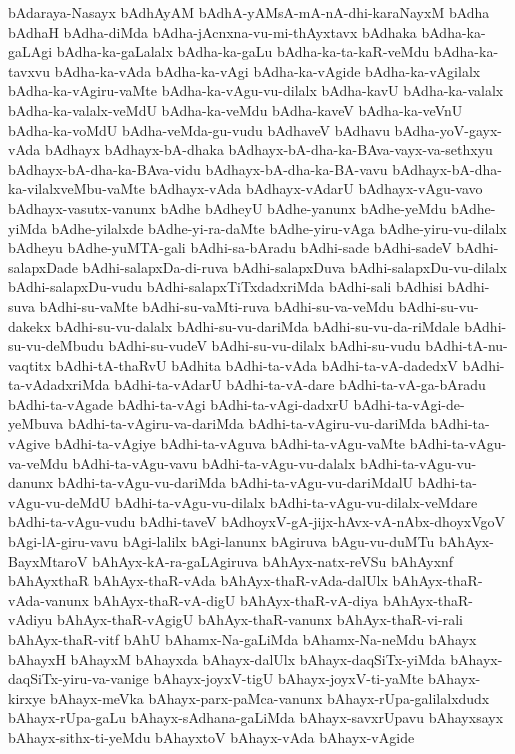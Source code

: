 {bAdaraya-Nasayx
bAdhAyAM
bAdhA-yAMsA-mA-nA-dhi-karaNayxM
bAdha
bAdhaH
bAdha-diMda
bAdha-jAcnxna-vu-mi-thAyxtavx
bAdhaka
bAdha-ka-gaLAgi
bAdha-ka-gaLalalx
bAdha-ka-gaLu
bAdha-ka-ta-kaR-veMdu
bAdha-ka-tavxvu
bAdha-ka-vAda
bAdha-ka-vAgi
bAdha-ka-vAgide
bAdha-ka-vAgilalx
bAdha-ka-vAgiru-vaMte
bAdha-ka-vAgu-vu-dilalx
bAdha-kavU
bAdha-ka-valalx
bAdha-ka-valalx-veMdU
bAdha-ka-veMdu
bAdha-kaveV
bAdha-ka-veVnU
bAdha-ka-voMdU
bAdha-veMda-gu-vudu
bAdhaveV
bAdhavu
bAdha-yoV-gayx-vAda
bAdhayx
bAdhayx-bA-dhaka
bAdhayx-bA-dha-ka-BAva-vayx-va-sethxyu
bAdhayx-bA-dha-ka-BAva-vidu
bAdhayx-bA-dha-ka-BA-vavu
bAdhayx-bA-dha-ka-vilalxveMbu-vaMte
bAdhayx-vAda
bAdhayx-vAdarU
bAdhayx-vAgu-vavo
bAdhayx-vasutx-vanunx
bAdhe
bAdheyU
bAdhe-yanunx
bAdhe-yeMdu
bAdhe-yiMda
bAdhe-yilalxde
bAdhe-yi-ra-daMte
bAdhe-yiru-vAga
bAdhe-yiru-vu-dilalx
bAdheyu
bAdhe-yuMTA-gali
bAdhi-sa-bAradu
bAdhi-sade
bAdhi-sadeV
bAdhi-salapxDade
bAdhi-salapxDa-di-ruva
bAdhi-salapxDuva
bAdhi-salapxDu-vu-dilalx
bAdhi-salapxDu-vudu
bAdhi-salapxTiTxdadxriMda
bAdhi-sali
bAdhisi
bAdhi-suva
bAdhi-su-vaMte
bAdhi-su-vaMti-ruva
bAdhi-su-va-veMdu
bAdhi-su-vu-dakekx
bAdhi-su-vu-dalalx
bAdhi-su-vu-dariMda
bAdhi-su-vu-da-riMdale
bAdhi-su-vu-deMbudu
bAdhi-su-vudeV
bAdhi-su-vu-dilalx
bAdhi-su-vudu
bAdhi-tA-nu-vaqtitx
bAdhi-tA-thaRvU
bAdhita
bAdhi-ta-vAda
bAdhi-ta-vA-dadedxV
bAdhi-ta-vAdadxriMda
bAdhi-ta-vAdarU
bAdhi-ta-vA-dare
bAdhi-ta-vA-ga-bAradu
bAdhi-ta-vAgade
bAdhi-ta-vAgi
bAdhi-ta-vAgi-dadxrU
bAdhi-ta-vAgi-de-yeMbuva
bAdhi-ta-vAgiru-va-dariMda
bAdhi-ta-vAgiru-vu-dariMda
bAdhi-ta-vAgive
bAdhi-ta-vAgiye
bAdhi-ta-vAguva
bAdhi-ta-vAgu-vaMte
bAdhi-ta-vAgu-va-veMdu
bAdhi-ta-vAgu-vavu
bAdhi-ta-vAgu-vu-dalalx
bAdhi-ta-vAgu-vu-danunx
bAdhi-ta-vAgu-vu-dariMda
bAdhi-ta-vAgu-vu-dariMdalU
bAdhi-ta-vAgu-vu-deMdU
bAdhi-ta-vAgu-vu-dilalx
bAdhi-ta-vAgu-vu-dilalx-veMdare
bAdhi-ta-vAgu-vudu
bAdhi-taveV
bAdhoyxV-gA-jijx-hAvx-vA-nAbx-dhoyxVgoV
bAgi-lA-giru-vavu
bAgi-lalilx
bAgi-lanunx
bAgiruva
bAgu-vu-duMTu
bAhAyx-BayxMtaroV
bAhAyx-kA-ra-gaLAgiruva
bAhAyx-natx-reVSu
bAhAyxnf
bAhAyxthaR
bAhAyx-thaR-vAda
bAhAyx-thaR-vAda-dalUlx
bAhAyx-thaR-vAda-vanunx
bAhAyx-thaR-vA-digU
bAhAyx-thaR-vA-diya
bAhAyx-thaR-vAdiyu
bAhAyx-thaR-vAgigU
bAhAyx-thaR-vanunx
bAhAyx-thaR-vi-rali
bAhAyx-thaR-vitf
bAhU
bAhamx-Na-gaLiMda
bAhamx-Na-neMdu
bAhayx
bAhayxH
bAhayxM
bAhayxda
bAhayx-dalUlx
bAhayx-daqSiTx-yiMda
bAhayx-daqSiTx-yiru-va-vanige
bAhayx-joyxV-tigU
bAhayx-joyxV-ti-yaMte
bAhayx-kirxye
bAhayx-meVka
bAhayx-parx-paMca-vanunx
bAhayx-rUpa-galilalxdudx
bAhayx-rUpa-gaLu
bAhayx-sAdhana-gaLiMda
bAhayx-savxrUpavu
bAhayxsayx
bAhayx-sithx-ti-yeMdu
bAhayxtoV
bAhayx-vAda
bAhayx-vAgide
}
